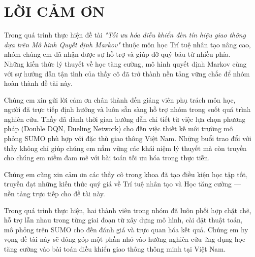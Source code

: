 \documentclass[a4paper]{article}
\begin{document}
\tableofcontents
\newpage
\section*{LỜI CẢM ƠN}
Trong quá trình thực hiện đề tài \textit{"Tối ưu hóa điều khiển đèn tín hiệu giao thông dựa trên Mô hình Quyết định Markov"} thuộc môn học Trí tuệ nhân tạo nâng cao, nhóm chúng em đã nhận được sự hỗ trợ và giúp đỡ quý báu từ nhiều phía. Những kiến thức lý thuyết về học tăng cường, mô hình quyết định Markov cùng với sự hướng dẫn tận tình của thầy cô đã trở thành nền tảng vững chắc để nhóm hoàn thành đề tài này.

Chúng em xin gửi lời cảm ơn chân thành đến giảng viên phụ trách môn học, người đã trực tiếp định hướng và luôn sẵn sàng hỗ trợ nhóm trong suốt quá trình nghiên cứu. Thầy đã dành thời gian hướng dẫn chi tiết từ việc lựa chọn phương pháp (Double DQN, Dueling Network) cho đến việc thiết kế môi trường mô phỏng SUMO phù hợp với đặc thù giao thông Việt Nam. Những buổi trao đổi với thầy không chỉ giúp chúng em nắm vững các khái niệm lý thuyết mà còn truyền cho chúng em niềm đam mê với bài toán tối ưu hóa trong thực tiễn.

Chúng em cũng xin cảm ơn các thầy cô trong khoa đã tạo điều kiện học tập tốt, truyền đạt những kiến thức quý giá về Trí tuệ nhân tạo và Học tăng cường — nền tảng trực tiếp cho đề tài này.

Trong quá trình thực hiện, hai thành viên trong nhóm đã luôn phối hợp chặt chẽ, hỗ trợ lẫn nhau trong từng giai đoạn từ xây dựng mô hình, cài đặt thuật toán, mô phỏng trên SUMO cho đến đánh giá và trực quan hóa kết quả. Chúng em hy vọng đề tài này sẽ đóng góp một phần nhỏ vào hướng nghiên cứu ứng dụng học tăng cường vào bài toán điều khiển giao thông thông minh tại Việt Nam.

\newpage


\newpage

\newpage

\newpage


\newpage


\newpage

\end{document}
